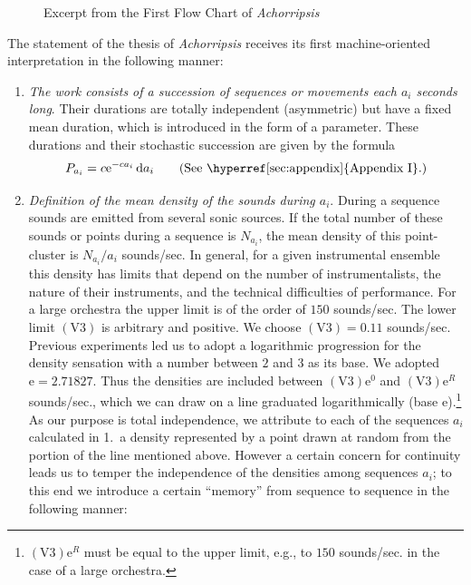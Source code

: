 \documentclass[letterpaper, 11pt]{article}
\begin{document}
\begin{figure}[htbp]
    \centering
    \resizebox{.95\linewidth}{!}{}
    \caption{Excerpt from the First Flow Chart of \textit{Achorripsis}}
    \label{fig:flow-chart}
\end{figure}

The statement of the thesis of \textit{Achorripsis} receives its first machine-oriented
interpretation in the following manner:

\begin{enumerate}
    \item
        \textit{The work consists of a succession of sequences or movements each \( a_i \) seconds
        long}. Their durations are totally independent (asymmetric) but have a fixed mean duration,
        which is introduced in the form of a parameter. These durations and their stochastic
        succession are given by the formula
        \[
            P_{a_i} = c \mathrm{e}^{-ca_i} \, \mathrm{d}a_i
            \tag{See \hyperref[sec:appendix]{Appendix I}.}
        \]
    \item
        \textit{Definition of the mean density of the sounds during \( a_i \)}. During a sequence
        sounds are emitted from several sonic sources. If the total number of these sounds or points
        during a sequence is \( N_{a_i} \), the mean density of this point-cluster is
        \( N_{a_i} / a_i \) sounds/sec. In general, for a given instrumental ensemble this density
        has limits that depend on the number of instrumentalists, the nature of their instruments,
        and the technical difficulties of performance. For a large orchestra the upper limit is of
        the order of \( 150 \) sounds/sec. The lower limit \( (\mathrm{V}3) \) is arbitrary and
        positive. We choose \( (\mathrm{V}3) = 0.11 \) sounds/sec. Previous experiments led us to
        adopt a logarithmic progression for the density sensation with a number between \( 2 \) and
        \( 3 \) as its base. We adopted \( \mathrm{e} = 2.71827 \). Thus the densities are included
        between \( (\mathrm{V}3)\mathrm{e}^0 \) and \( (\mathrm{V}3)\mathrm{e}^R \) sounds/sec.,
        which we can draw on a line graduated logarithmically (base \( \mathrm{e} \)).\footnote{
        \( (\mathrm{V}3)\mathrm{e}^R \) must be equal to the upper limit, e.g., to \( 150 \)
        sounds/sec. in the case of a large orchestra.} As our purpose is total independence, we
        attribute to each of the sequences \( a_i \) calculated in 1.\ a density represented
        by a point drawn at random from the portion of the line mentioned above. However a certain
        concern for continuity leads us to temper the independence of the densities among sequences
        \( a_i \); to this end we introduce a certain ``memory'' from sequence to sequence in the
        following manner:


\end{enumerate}
\end{document}
